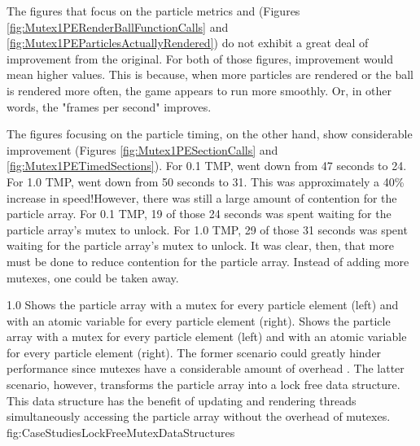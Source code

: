 The figures that focus on the particle metrics  and  (Figures \ref{fig:Mutex1PERenderBallFunctionCalls} and \ref{fig:Mutex1PEParticlesActuallyRendered}) do not exhibit a great deal of improvement from the original. For both of those figures, improvement would mean higher values. This is because, when more particles are rendered or the ball is rendered more often, the game appears to run more smoothly. Or, in other words, the "frames per second" improves. 

The figures focusing on the particle timing, on the other hand, show considerable improvement (Figures \ref{fig:Mutex1PESectionCalls} and \ref{fig:Mutex1PETimedSections}). For 0.1 TMP,  went down from 47 seconds to 24. For 1.0 TMP,  went down from 50 seconds to 31. This was approximately a 40\% increase in speed!\footnotemark However, there was still a large amount of contention for the particle array. For 0.1 TMP, 19 of those 24 seconds was spent waiting for the particle array's mutex to unlock. For 1.0 TMP, 29 of those 31 seconds was spent waiting for the particle array's mutex to unlock. It was clear, then, that more must be done to reduce contention for the particle array. Instead of adding more mutexes, one could be taken away.


{1.0}
{Shows the particle array with a mutex for every particle element (left) and with an atomic variable for every particle element (right).}
{Shows the particle array with a mutex for every particle element (left) and with an atomic variable for every particle element (right). The former scenario could greatly hinder performance since mutexes have a considerable amount of overhead \cite{ArangoDBLocklessAndMutex}. The latter scenario, however, transforms the particle array into a lock free data structure. This data structure has the benefit of updating and rendering threads simultaneously accessing the particle array without the overhead of mutexes. }
{fig:CaseStudiesLockFreeMutexDataStructures}

